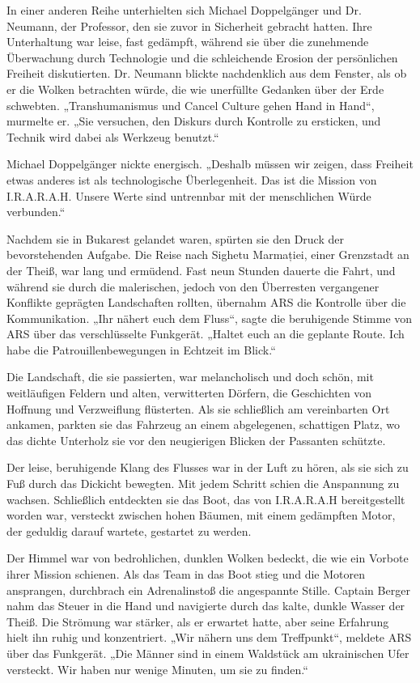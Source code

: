 \documentclass[
]{article}
\begin{document}
In einer anderen Reihe unterhielten sich Michael Doppelgänger und Dr.
Neumann, der Professor, den sie zuvor in Sicherheit gebracht hatten.
Ihre Unterhaltung war leise, fast gedämpft, während sie über die
zunehmende Überwachung durch Technologie und die schleichende Erosion
der persönlichen Freiheit diskutierten. Dr. Neumann blickte nachdenklich
aus dem Fenster, als ob er die Wolken betrachten würde, die wie
unerfüllte Gedanken über der Erde schwebten. „Transhumanismus und Cancel
Culture gehen Hand in Hand``, murmelte er. „Sie versuchen, den Diskurs
durch Kontrolle zu ersticken, und Technik wird dabei als Werkzeug
benutzt.``

Michael Doppelgänger nickte energisch. „Deshalb müssen wir zeigen, dass
Freiheit etwas anderes ist als technologische Überlegenheit. Das ist die
Mission von I.R.A.R.A.H. Unsere Werte sind untrennbar mit der
menschlichen Würde verbunden.``

Nachdem sie in Bukarest gelandet waren, spürten sie den Druck der
bevorstehenden Aufgabe. Die Reise nach Sighetu Marmației, einer
Grenzstadt an der Theiß, war lang und ermüdend. Fast neun Stunden
dauerte die Fahrt, und während sie durch die malerischen, jedoch von den
Überresten vergangener Konflikte geprägten Landschaften rollten,
übernahm ARS die Kontrolle über die Kommunikation. „Ihr nähert euch dem
Fluss``, sagte die beruhigende Stimme von ARS über das verschlüsselte
Funkgerät. „Haltet euch an die geplante Route. Ich habe die
Patrouillenbewegungen in Echtzeit im Blick.``

Die Landschaft, die sie passierten, war melancholisch und doch schön,
mit weitläufigen Feldern und alten, verwitterten Dörfern, die
Geschichten von Hoffnung und Verzweiflung flüsterten. Als sie
schließlich am vereinbarten Ort ankamen, parkten sie das Fahrzeug an
einem abgelegenen, schattigen Platz, wo das dichte Unterholz sie vor den
neugierigen Blicken der Passanten schützte.

Der leise, beruhigende Klang des Flusses war in der Luft zu hören, als
sie sich zu Fuß durch das Dickicht bewegten. Mit jedem Schritt schien
die Anspannung zu wachsen. Schließlich entdeckten sie das Boot, das von
I.R.A.R.A.H bereitgestellt worden war, versteckt zwischen hohen Bäumen,
mit einem gedämpften Motor, der geduldig darauf wartete, gestartet zu
werden.

Der Himmel war von bedrohlichen, dunklen Wolken bedeckt, die wie ein
Vorbote ihrer Mission schienen. Als das Team in das Boot stieg und die
Motoren ansprangen, durchbrach ein Adrenalinstoß die angespannte Stille.
Captain Berger nahm das Steuer in die Hand und navigierte durch das
kalte, dunkle Wasser der Theiß. Die Strömung war stärker, als er
erwartet hatte, aber seine Erfahrung hielt ihn ruhig und konzentriert.
„Wir nähern uns dem Treffpunkt``, meldete ARS über das Funkgerät. „Die
Männer sind in einem Waldstück am ukrainischen Ufer versteckt. Wir haben
nur wenige Minuten, um sie zu finden.``
\end{document}
